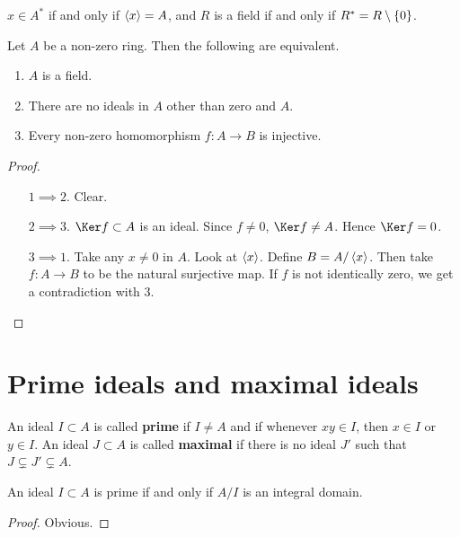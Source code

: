\begin{remark*}
$ x \in A^* $ if and only if $ \left\langle x \right\rangle = A $, and $ R $ is a field if and only if $ R^* = R \setminus \cbr{0} $.
\end{remark*}

\begin{proposition}
Let $ A $ be a non-zero ring. Then the following are equivalent.
\begin{enumerate}
\item $ A $ is a field.
\item There are no ideals in $ A $ other than zero and $ A $.
\item Every non-zero homomorphism $ f : A \to B $ is injective.
\end{enumerate}
\end{proposition}

\begin{proof}
\hfill
\begin{itemize}[leftmargin=0.5in]
\item[$ 1 \implies 2 $.] Clear.
\item[$ 2 \implies 3 $.] $ \Ker f \subset A $ is an ideal. Since $ f \ne 0 $, $ \Ker f \ne A $. Hence $ \Ker f = 0 $.
\item[$ 3 \implies 1 $.] Take any $ x \ne 0 $ in $ A $. Look at $ \left\langle x \right\rangle $. Define $ B = A / \left\langle x \right\rangle $. Then take $ f : A \to B $ to be the natural surjective map. If $ f $ is not identically zero, we get a contradiction with $ 3 $.
\end{itemize}
\end{proof}

\pagebreak

\section{Prime ideals and maximal ideals}

\begin{definition}
An ideal $ I \subset A $ is called \textbf{prime} if $ I \ne A $ and if whenever $ xy \in I $, then $ x \in I $ or $ y \in I $. An ideal $ J \subset A $ is called \textbf{maximal} if there is no ideal $ J' $ such that $ J \subsetneq J' \subsetneq A $.
\end{definition}

\begin{lemma}
An ideal $ I \subset A $ is prime if and only if $ A / I $ is an integral domain.
\end{lemma}

\begin{proof}
Obvious.
\end{proof}

